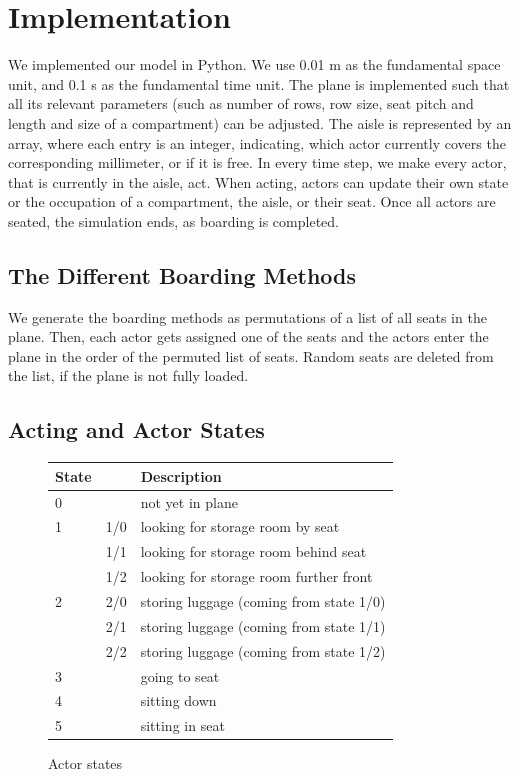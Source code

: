 \documentclass[11pt]{article}
\begin{document}
\section{Implementation}

We implemented our model in Python. We use 0.01 m as the fundamental space unit, and 0.1 s as the fundamental time unit. The plane is implemented such that all its relevant parameters (such as number of rows, row size, seat pitch and length and size of a compartment) can be adjusted. The aisle is represented by an array, where each entry is an integer, indicating, which actor currently covers the corresponding millimeter, or if it is free. In every time step, we make every actor, that is currently in the aisle, act. When acting, actors can update their own state or the occupation of a compartment, the aisle, or their seat. Once  all actors are seated, the simulation ends, as boarding is completed.

\subsection{The Different Boarding Methods}
We generate the boarding methods as permutations of a list of all seats in the plane. Then, each actor gets assigned one of the seats and the actors enter the plane in the order of the permuted list of seats. Random seats are deleted from the list, if the plane is not fully loaded.

\subsection{Acting and Actor States}
\begin{figure}[h!]
	\center
\begin{tabular}{|ll|l|}
	\hline
	State & &Description\\
	\hline
0 &     & not yet in plane                        \\
\hline
1 & 1/0 & looking for storage room by seat        \\
  & 1/1 & looking for storage room behind seat    \\
  & 1/2 & looking for storage room further front  \\
  \hline
2 & 2/0 & storing luggage (coming from state 1/0) \\
  & 2/1 & storing luggage (coming from state 1/1) \\
  & 2/2 & storing luggage (coming from state 1/2) \\
  \hline
3 &     & going to seat                           \\
\hline
4 &     & sitting down                            \\
\hline
5 &     & sitting in seat       \\                 
\hline

\end{tabular}
\caption{Actor states}
\label{tab:states}
\end{figure}
\end{document}

